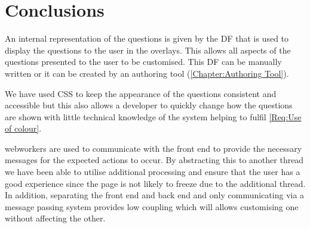 \section{Conclusions}

An internal representation of the questions is given by the \gls{DF} that is used to display the questions to the user in the overlays. This allows all aspects of the questions presented to the user to be customised. This \gls{DF} can be manually written or it can be created by an authoring tool (\autoref{Chapter:Authoring Tool}).

We have used \gls{CSS} to keep the appearance of the questions consistent and accessible but this also allows a developer to quickly change how the questions are shown with little technical knowledge of the system helping to fulfil \cref{Req:Use of colour}.

\Glspl{webworker} are used to communicate with the front end to provide the necessary messages for the expected actions to occur. By abstracting this to another thread we have been able to utilise additional processing and ensure that the user has a good experience since the page is not likely to freeze due to the additional thread. In addition, separating the front end and back end and only communicating via a message passing system provides low coupling which will allows customising one without affecting the other.
